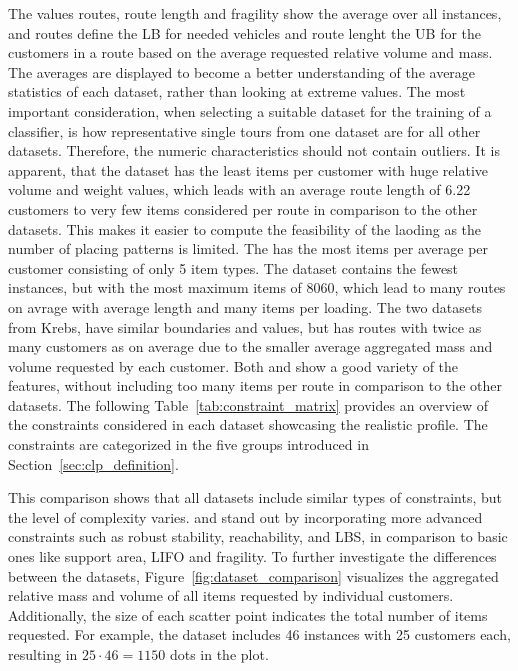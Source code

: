 

The values routes, route length and fragility show the average over all instances, and
routes define the \gls{LB} for needed vehicles and route lenght the \gls{UB} for the customers in a route based on the average
requested relative volume and mass. The averages are displayed to become a better understanding of the average
statistics of each dataset, rather than looking at extreme values.
The most important consideration, when selecting a suitable dataset for the training of a classifier,
is how representative single tours from one dataset are for all other datasets. Therefore, the numeric characteristics
should not contain outliers. It is apparent, that the \gendreauDataSetText dataset has the least items per customer
with huge relative volume and weight values, which leads with an average route length of 6.22 customers to very few items
considered per route in comparison to the other datasets. This makes it easier to compute the feasibility of the laoding
as the number of placing patterns is limited. The \mouraDataSetText has the most items per average per customer consisting
of only 5 item types. The \ceschiaDataSetText dataset contains the fewest instances, but with the most maximum items of 8060,
which lead to many routes on avrage with average length and many items per loading. The two datasets from Krebs, have similar
boundaries and values, but \krebsBDataSetText has routes with twice as many customers as \krebsADataSetText on average due
to the smaller average aggregated mass and volume requested by each customer. Both \krebsADataSetText and \gendreauDataSetText
show a good variety of the features, without including too many items per route in comparison to the other datasets.
The following Table~\ref{tab:constraint_matrix} provides an overview of the constraints considered
in each dataset showcasing the realistic profile. The constraints are categorized in the five groups introduced
in Section~\ref{sec:clp_definition}.
\clearpage


This comparison shows that all datasets include similar types of constraints, but the level
of complexity varies. \krebsADataSetText and \ceschiaDataSetText stand out by incorporating
more advanced constraints such as robust stability, reachability, and \gls{LBS}, in comparison to
basic ones like support area, \gls{LIFO} and fragility. To further investigate the differences
between the datasets, Figure~\ref{fig:dataset_comparison} visualizes the aggregated relative mass and
volume of all items requested by individual customers.
Additionally, the size of each scatter point indicates the total number of items requested.
For example, the \mouraDataSetText dataset includes 46
instances with 25 customers each, resulting in $25 \cdot 46 = 1150$ dots in the plot.


